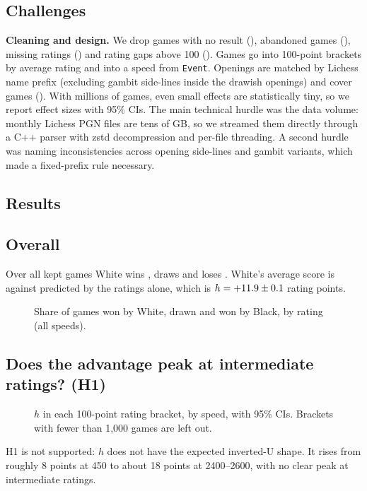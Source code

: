 \documentclass[11pt,a4paper]{article}
\begin{document}
\subsection*{Challenges}
\textbf{Cleaning and design.} We drop games with no result (\SkipNoResult), abandoned games
(\SkipAbandoned), missing ratings (\SkipNoRating) and rating gaps above 100 (\SkipGap). Games go
into 100-point brackets by average rating and into a speed from \texttt{Event}. Openings are
matched by Lichess name prefix (excluding gambit side-lines inside the drawish openings) and
cover \OpeningGames{} games (\OpeningShare{}). With millions of games, even small effects are
statistically tiny, so we report effect sizes with 95\% CIs.
The main technical hurdle was the data volume: monthly Lichess PGN files are tens of GB, so we
streamed them directly through a C++ parser with zstd decompression and per-file threading. A
second hurdle was naming inconsistencies across opening side-lines and gambit variants, which
made a fixed-prefix rule necessary.

\subsection*{Results}
\FloatBarrier
\subsection*{Overall}
Over all kept games White wins \WhiteAll, draws \DrawAll{} and loses \BlackAll. White's average
score is \ScoreAll{} against \ExpectedAll{} predicted by the ratings alone, which is
$h = +11.9 \pm 0.1$ rating points.

\begin{figure}[!htbp]
\centering
\FigResults
\caption{Share of games won by White, drawn and won by Black, by rating (all speeds).}
\end{figure}

\FloatBarrier
\subsection*{Does the advantage peak at intermediate ratings? (H1)}

\begin{figure}[!htbp]
\centering
\FigSpeed
\caption{$h$ in each 100-point rating bracket, by speed, with 95\% CIs. Brackets with fewer than
1,000 games are left out.}
\end{figure}

H1 is not supported: $h$ does not have the expected inverted-U shape. It rises from roughly 8 points at 450 to about 18 points at 2400--2600, with no clear peak at intermediate ratings.
\end{document}
